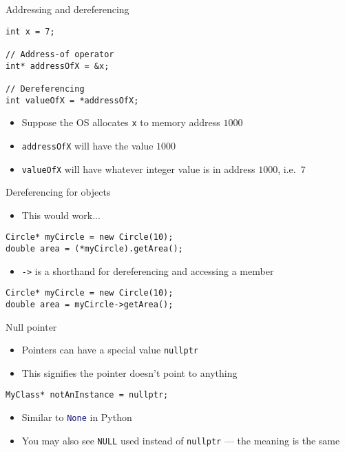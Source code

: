 \begin{frame}[fragile]{Addressing and dereferencing}
    \begin{lstlisting}
int x = 7;

// Address-of operator
int* addressOfX = &x;

// Dereferencing
int valueOfX = *addressOfX;
    \end{lstlisting}
    \begin{itemize}
        \item Suppose the OS allocates \lstinline{x} to memory address $1000$
        \item \lstinline{addressOfX} will have the value $1000$
        \item \lstinline{valueOfX} will have whatever integer value is in address $1000$, i.e.\ $7$
    \end{itemize}
\end{frame}

\begin{frame}[fragile]{Dereferencing for objects}
    \begin{itemize}
        \item This would work...
    \end{itemize}
    \begin{lstlisting}
Circle* myCircle = new Circle(10);
double area = (*myCircle).getArea();
    \end{lstlisting}
    \begin{itemize}
        \item \lstinline{->} is a shorthand for dereferencing and accessing a member
    \end{itemize}
    \begin{lstlisting}
Circle* myCircle = new Circle(10);
double area = myCircle->getArea();
    \end{lstlisting}
\end{frame}

\begin{frame}[fragile]{Null pointer}
    \begin{itemize}
        \item Pointers can have a special value \lstinline{nullptr}
        \item This signifies the pointer doesn't point to anything
    \end{itemize}
    \begin{lstlisting}
MyClass* notAnInstance = nullptr;
    \end{lstlisting}
    \begin{itemize}
        \item Similar to \lstinline[language=Python]{None} in Python
        \item You may also see \lstinline{NULL} used instead of \lstinline{nullptr} ---
            the meaning is the same
    \end{itemize}
\end{frame}

